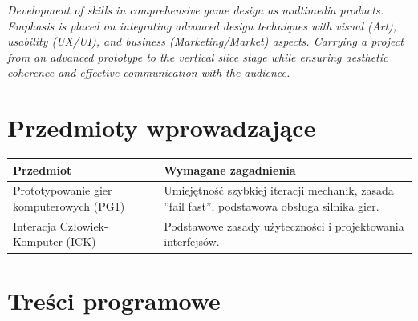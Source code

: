 \documentclass[12pt, a4paper]{article}
\newcommand{\thdrule}{\noalign{\global\setlength{\extrarowheight}{0pt}}}
\newcommand{\thdend}{\noalign{\global\setlength{\extrarowheight}{3pt}}}
\begin{document}
\textit{Development of skills in comprehensive game design as multimedia products. Emphasis is placed on integrating advanced design techniques with visual (Art), usability (UX/UI), and business (Marketing/Market) aspects. Carrying a project from an advanced prototype to the vertical slice stage while ensuring aesthetic coherence and effective communication with the audience.}


\section{Przedmioty wprowadzające}

{\scriptsize
\begin{tabularx}{\textwidth}{m{5cm}Y}
\thdrule\toprule
{} {\color{white}\textbf{Przedmiot}} & {\color{white}\textbf{Wymagane zagadnienia}} \\
\midrule\thdend
   Prototypowanie gier komputerowych (PG1)  & Umiejętność szybkiej iteracji mechanik, zasada ''fail fast'', podstawowa obsługa silnika gier. \\
   Interacja Człowiek-Komputer (ICK)  & Podstawowe zasady użyteczności i projektowania interfejsów. \\
\bottomrule
\end{tabularx}}

\section{Treści programowe}
\end{document}
